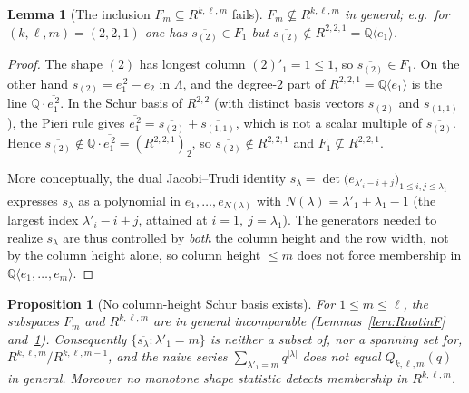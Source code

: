\documentclass{amsart}
\newtheorem{lemma}{Lemma}
\newtheorem{proposition}{Proposition}
\theoremstyle{definition}
\newcommand{\Q}{\mathbb{Q}}
\newcommand{\Rklm}{R^{k,\ell,m}}
\begin{document}
\begin{lemma}[The inclusion $F_m\subseteq\Rklm$ fails]\label{lem:FnotinR}
$F_m\not\subseteq\Rklm$ in general; e.g.\ for $(k,\ell,m)=(2,2,1)$ one has
$\overline{s_{(2)}}\in F_1$ but $\overline{s_{(2)}}\notin R^{2,2,1}=\Q\langle e_1\rangle$.
\end{lemma}

\begin{proof}
The shape $(2)$ has longest column $(2)'_1=1\le1$, so $\overline{s_{(2)}}\in F_1$.
On the other hand $s_{(2)}=e_1^{\,2}-e_2$ in $\Lambda$, and the degree-$2$ part of
$R^{2,2,1}=\Q\langle e_1\rangle$ is the line $\Q\cdot\overline{e_1^{\,2}}$. In the
Schur basis of $R^{2,2}$ (with distinct basis vectors $\overline{s_{(2)}}$ and
$\overline{s_{(1,1)}}$), the Pieri rule gives
$\overline{e_1^{\,2}}=\overline{s_{(2)}}+\overline{s_{(1,1)}}$, which is not a scalar
multiple of $\overline{s_{(2)}}$. Hence $\overline{s_{(2)}}\notin
\Q\cdot\overline{e_1^{\,2}}=(R^{2,2,1})_2$, so $\overline{s_{(2)}}\notin R^{2,2,1}$
and $F_1\not\subseteq R^{2,2,1}$.

More conceptually, the dual Jacobi--Trudi identity
$s_\lambda=\det\bigl(e_{\lambda'_i-i+j}\bigr)_{1\le i,j\le\lambda_1}$ expresses
$s_\lambda$ as a polynomial in $e_1,\dots,e_{N(\lambda)}$ with
$N(\lambda)=\lambda'_1+\lambda_1-1$ (the largest index $\lambda'_i-i+j$, attained at
$i=1,\ j=\lambda_1$). The generators needed to realize $s_\lambda$ are thus controlled
by \emph{both} the column height and the row width, not by the column height alone, so
column height $\le m$ does not force membership in $\Q\langle e_1,\dots,e_m\rangle$.
\end{proof}

\begin{proposition}[No column-height Schur basis exists]\label{prop:nocolbasis}
For $1\le m\le\ell$, the subspaces $F_m$ and $\Rklm$ are in general incomparable
(Lemmas~\ref{lem:RnotinF} and~\ref{lem:FnotinR}). Consequently
$\{\overline{s_\lambda}:\lambda'_1=m\}$ is neither a subset of, nor a spanning set
for, $\Rklm/R^{k,\ell,m-1}$, and the naive series $\sum_{\lambda'_1=m}q^{|\lambda|}$
does \emph{not} equal $Q_{k,\ell,m}(q)$ in general. Moreover no monotone shape
statistic detects membership in $\Rklm$.
\end{proposition}
\end{document}
